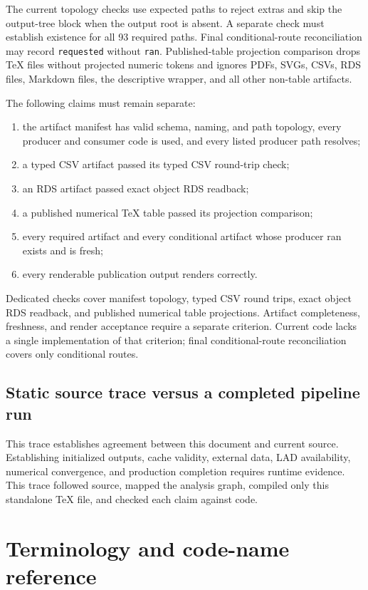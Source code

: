 \documentclass[11pt]{article}
\DeclareRobustCommand{\code}[1]{%
  \ifmmode\text{\ttfamily\detokenize{#1}}\else\nolinkurl{#1}\fi}
\begin{document}
The current topology checks use expected paths to reject extras and skip the
output-tree block when the output root is absent. A separate check must establish
existence for all 93 required paths. Final conditional-route reconciliation may
record \code{requested} without \code{ran}. Published-table projection comparison
drops TeX files without projected numeric tokens and ignores PDFs, SVGs, CSVs,
RDS files, Markdown files, the descriptive wrapper, and all other non-table
artifacts.

The following claims must remain separate:
\begin{enumerate}
  \item the artifact manifest has valid schema, naming, and path topology,
    every producer and consumer code is used, and every listed producer path
    resolves;
  \item a typed CSV artifact passed its typed CSV round-trip check;
  \item an RDS artifact passed exact object RDS readback;
  \item a published numerical TeX table passed its projection comparison;
  \item every required artifact and every conditional artifact whose producer
    ran exists and is fresh;
  \item every renderable publication output renders correctly.
\end{enumerate}
Dedicated checks cover manifest topology, typed CSV round trips, exact object
RDS readback, and published numerical table projections. Artifact completeness,
freshness, and render acceptance require a separate criterion. Current code
lacks a single implementation of that criterion; final conditional-route
reconciliation covers only conditional routes.

\subsection{Static source trace versus a completed pipeline run}

This trace establishes agreement between this document and current source.
Establishing initialized outputs, cache validity, external data, LAD
availability, numerical convergence, and production completion requires runtime
evidence. This
trace followed source, mapped the analysis graph, compiled only this standalone
TeX file, and checked each claim against code.

\clearpage
\section{Terminology and code-name reference}
\label{sec:terminology}
\end{document}
